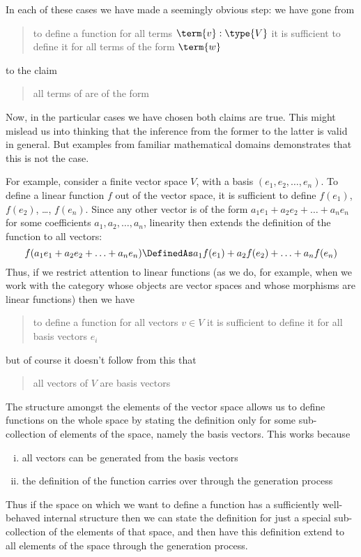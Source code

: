 In each of these cases we have made a seemingly obvious step: we have gone from
\begin{quote}
to define a function for all terms $\term{v}:\type{V}$ it is sufficient to define it for all terms of the form $\term{w}$
\end{quote}
to the claim
\begin{quote}
all terms of  are of the form 
\end{quote}
Now, in the particular cases we have chosen both claims are true.  This might mislead us into thinking that the inference from the former to the latter is valid in general.  But examples from familiar mathematical domains demonstrates that this is not the case.

For example, consider a finite vector space $V$, with a basis $(e_1, e_2, \ldots, e_n)$.  To define a linear function $f$ out of the vector space, it is sufficient to define $f(e_1)$, $f(e_2)$, \ldots, $f(e_n)$.  Since any other vector is of the form $a_1 e_1 + a_2 e_2 + \ldots + a_n e_n$ for some coefficients $a_1, a_2, \ldots, a_n$, linearity then extends the definition of the function to all vectors:
\[
f(a_1 e_1 + a_2 e_2 + \ldots + a_n e_n) \DefinedAs
a_1 f(e_1) + a_2 f(e_2) + \ldots + a_n f(e_n)
\]
Thus, if we restrict attention to linear functions (as we do, for example, when we work with the category whose objects are vector spaces and whose morphisms are linear functions) then we have
\begin{quote}
to define a function for all vectors $v \in V$ it is sufficient to define it for all basis vectors $e_i$
\end{quote}
but of course it doesn't follow from this that 
\begin{quote}
all vectors of $V$ are basis vectors
\end{quote}
The structure amongst the elements of the vector space allows us to define functions on the whole space by stating the definition only for some sub-collection of elements of the space, namely the basis vectors.  This works because
\begin{enumerate}[(i)]
\item all vectors can be generated from the basis vectors
\item the definition of the function carries over through the generation process
\end{enumerate}

Thus if the space on which we want to define a function has a sufficiently well-behaved internal structure then we can state the definition for just a special sub-collection of the elements of that space, and then have this definition extend to all elements of the space through the generation process.

